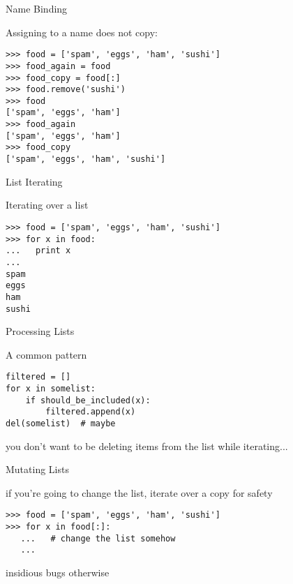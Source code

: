 \documentclass{beamer}
\begin{document}
\begin{frame}[fragile]{Name Binding}

{\Large Assigning to a name does not copy:}

\begin{verbatim}
>>> food = ['spam', 'eggs', 'ham', 'sushi']
>>> food_again = food
>>> food_copy = food[:]
>>> food.remove('sushi')
>>> food
['spam', 'eggs', 'ham']
>>> food_again
['spam', 'eggs', 'ham']
>>> food_copy
['spam', 'eggs', 'ham', 'sushi']
\end{verbatim}

\end{frame} 

\begin{frame}[fragile]{List Iterating}

{\Large Iterating over a list}

\begin{verbatim}
>>> food = ['spam', 'eggs', 'ham', 'sushi']
>>> for x in food:
...   print x
...
spam
eggs
ham
sushi
\end{verbatim}

\end{frame} 

\begin{frame}[fragile]{Processing Lists}

{\Large A common pattern}

\begin{verbatim}
filtered = []
for x in somelist:
    if should_be_included(x):
        filtered.append(x)
del(somelist)  # maybe
\end{verbatim}

{\Large you don't want to be deleting items from the list while iterating...}

\end{frame} 

\begin{frame}[fragile]{Mutating Lists}

{\Large if you're going to change the list, iterate over a copy for safety }

\begin{verbatim}
>>> food = ['spam', 'eggs', 'ham', 'sushi']
>>> for x in food[:]:
   ...   # change the list somehow
   ...
\end{verbatim}

{\Large insidious bugs otherwise}

\end{frame} 
\end{document}
